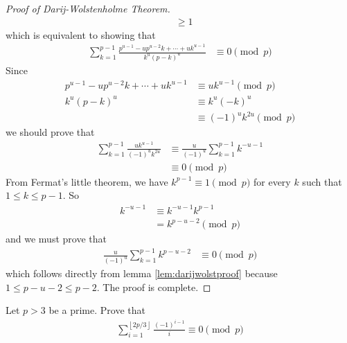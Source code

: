 \documentclass{subfile}
\begin{document}
\begin{proof}[Proof of Darij-Wolstenholme Theorem]
\begin{align*}
				& \geq 1
		\end{align*}
		which is equivalent to showing that
		\begin{align*}
			\sum_{k = 1}^{p - 1}\frac {p^{u - 1} - up^{u - 2}k+\cdots + uk^{u - 1}}{k^{u}(p-k)^{u}}
				& \equiv 0 \pmod p
		\end{align*}
		Since
			\begin{align*}
				p^{u - 1} - up^{u - 2}k+\cdots + uk^{u - 1}
					& \equiv uk^{u - 1} \pmod p\\
				k^{u}\left(p - k\right)^{u}
					& \equiv k^{u}\left(-k\right)^{u}\\
					& \equiv (-1)^u k^{2u} \pmod p
			\end{align*}
		we should prove that
			\begin{align*}
				\sum_{k = 1}^{p - 1}\frac {uk^{u - 1}}{\left( - 1\right)^{u}k^{2u}}
					& \equiv\frac {u}{\left( - 1\right)^{u}}\sum_{k = 1}^{p - 1}k^{ - u - 1}\\
					& \equiv 0 \pmod p
			\end{align*}
		From Fermat's little theorem, we have $k^{p-1} \equiv 1 \pmod p$ for every $k$ such that $1 \leq k \leq p-1$. So
			\begin{align*}
				k^{ - u - 1}
					& \equiv k^{ - u - 1}k^{p - 1}\\
					& = k^{p - u - 2}\pmod p
			\end{align*}
		and we must prove that
			\begin{align*}
				\frac {u}{\left( - 1\right)^{u}}\sum_{k = 1}^{p - 1}k^{p - u - 2}
					& \equiv 0 \pmod p
			\end{align*}
		which follows directly from lemma \eqref{lem:darijwolstproof} because $ 1\leq p - u - 2\leq p - 2$. The proof is complete.
	\end{proof}

	\begin{problem}
		Let $p>3$ be a prime. Prove that
		\begin{align*}
			\sum_{i = 1}^{\left\lfloor 2p/3\right\rfloor}\frac {\left( - 1\right)^{i - 1}}{i} \equiv 0 \pmod p
		\end{align*}
	\end{problem}
\end{document}
